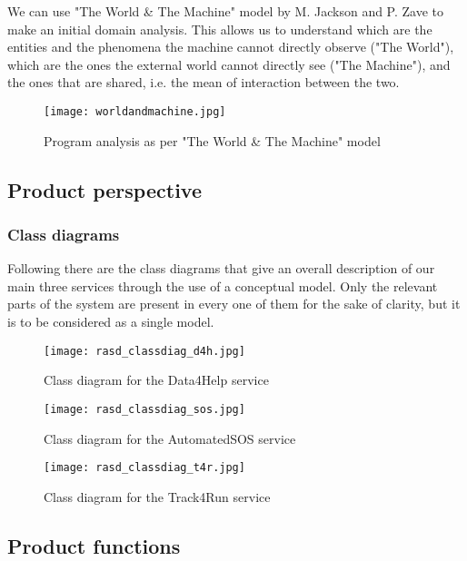 \documentclass[../main.tex]{subfiles}
\begin{document}
We can use "The World \& The Machine" model by M. Jackson and P. Zave to make an initial domain analysis. This allows us to understand which are the entities and the phenomena the machine cannot directly observe ("The World"), which are the ones the external world cannot directly see ("The Machine"), and the ones that are shared, i.e. the mean of interaction between the two.

\begin{figure}[h!]
	\texttt{[image: worldandmachine.jpg]}
	\caption{Program analysis as per "The World \& The Machine" model}
	\label{fig:worldandmachine}
\end{figure}

\subsection{Product perspective}

\subsubsection{Class diagrams}

Following there are the class diagrams that give an overall description of our main three services through the use of a conceptual model. Only the relevant parts of the system are present in every one of them for the sake of clarity, but it is to be considered as a single model.
\newpage
\thispagestyle{empty} %
\begin{figure}[H]
	\texttt{[image: rasd\_classdiag\_d4h.jpg]}
	\caption{Class diagram for the Data4Help service}
	\label{fig:classdiag_d4h}
\end{figure}
\newpage
\thispagestyle{empty}
\begin{figure}[H]
	\texttt{[image: rasd\_classdiag\_sos.jpg]}
	\caption{Class diagram for the AutomatedSOS service}
	\label{fig:classdiag_sos}
\end{figure}
\newpage
\thispagestyle{empty}
\begin{figure}[H]
	\texttt{[image: rasd\_classdiag\_t4r.jpg]}
	\caption{Class diagram for the Track4Run service}
	\label{fig:classdiag_t4r}
\end{figure}
\newpage

\subsection{Product functions}
\end{document}
